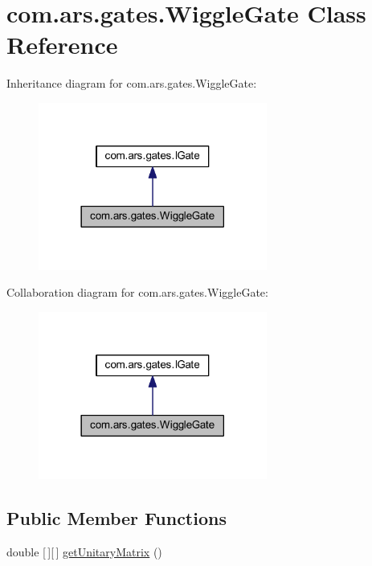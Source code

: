 \hypertarget{classcom_1_1ars_1_1gates_1_1_wiggle_gate}{}\section{com.\+ars.\+gates.\+Wiggle\+Gate Class Reference}
\label{classcom_1_1ars_1_1gates_1_1_wiggle_gate}


Inheritance diagram for com.\+ars.\+gates.\+Wiggle\+Gate\+:\nopagebreak
\begin{figure}[H]
\begin{center}
\leavevmode
\includegraphics[width=213pt]{classcom_1_1ars_1_1gates_1_1_wiggle_gate__inherit__graph}
\end{center}
\end{figure}


Collaboration diagram for com.\+ars.\+gates.\+Wiggle\+Gate\+:\nopagebreak
\begin{figure}[H]
\begin{center}
\leavevmode
\includegraphics[width=213pt]{classcom_1_1ars_1_1gates_1_1_wiggle_gate__coll__graph}
\end{center}
\end{figure}
\subsection*{Public Member Functions}
\begin{DoxyCompactItemize}
\item 
double \mbox{[}$\,$\mbox{]}\mbox{[}$\,$\mbox{]} \hyperlink{classcom_1_1ars_1_1gates_1_1_wiggle_gate_a1007dd60c814cd64bb6abbd8c3b9e409}{get\+Unitary\+Matrix} ()
\end{DoxyCompactItemize}


